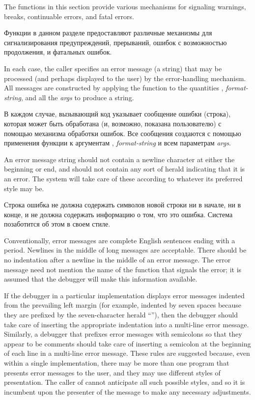 The functions in this section provide various mechanisms
for signaling warnings, breaks, continuable errors, and fatal errors.

Функции в данном разделе предоставляют различные механизмы для сигнализирования
предупреждений, прерываний, ошибок с возможностью продолжения, и фатальных ошибок.

In each case, the caller specifies an error message (a string) that may be
processed (and perhaps displayed to the user) by the error-handling
mechanism.  All messages are
constructed by applying the function
 to the quantities {\nil}, \emph{format-string},
and all the \emph{args} to produce a string.

В каждом случае, вызывающий код указывает сообщение ошибки (строка), которая
может быть обработана (и, возможно, показана пользователю) с помощью механизма
обработки ошибок. Все сообщения создаются с помощью применения функции
 к аргументам {\nil}, \emph{format-string} и всем параметрам
\emph{args}.

An error message string should not contain a newline character
at either the beginning or end, and should not contain any sort of
herald indicating that it is an error.  The system will take care of
these according to whatever its preferred style may be.  

Строка ошибка не должна содержать символов новой строки ни в начале, ни в конце,
и не должна содержать информацию о том, что это ошибка. Система позаботится об
этом в своем стиле.

Conventionally,
error messages are complete English sentences ending with a period.
Newlines in the middle of long messages are acceptable.  There
should be no indentation after a newline in the middle of an
error message.  The error message need not mention the name of the function
that signals the error; it is assumed that the debugger will make this
information available.

\beforenoterule
\begin{implementation}
If the debugger in a particular implementation
displays error messages indented from the prevailing left margin
(for example, indented by seven spaces because
they are prefixed by the seven-character herald ``''),
then the debugger should take care of inserting
the appropriate indentation into a multi-line error message.
Similarly, a debugger that prefixes error messages with semicolons
so that they appear to be comments
should take care of inserting a semicolon at the beginning of each
line in a multi-line error message.  These rules are suggested
because, even within a single
implementation, there may be more than one program that presents error
messages to the user, and they may use different styles of
presentation.  The caller
of  cannot anticipate all such possible styles,
and so it is incumbent upon the presenter of the message
to make any necessary adjustments.
\end{implementation}
\afternoterule

